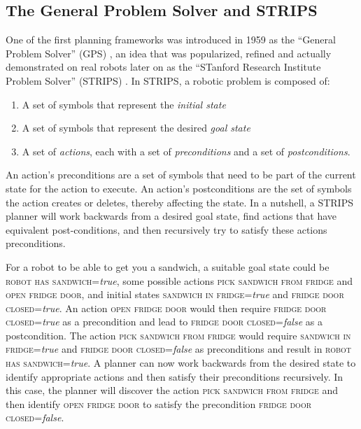 \subsection{The General Problem Solver and STRIPS}

One of the first planning frameworks was introduced in 1959 as the ``General Problem Solver'' (GPS) \cite{newell1959report}, an idea that was popularized, refined and actually demonstrated on real robots later on as the ``STanford Research Institute Problem Solver'' (STRIPS) \cite{fikes1971strips}.
%
In STRIPS, a robotic problem is composed of:

\begin{enumerate}
\item A set of symbols that represent the \textsl{initial state}
\item A set of symbols that represent the desired \textsl{goal state}
\item A set of \textsl{actions}, each with a set of \textsl{preconditions} and a set of \textsl{postconditions}.
\end{enumerate}

An action's preconditions are a set of symbols that need to be part of the current state for the action to execute. An action's postconditions are the set of symbols the action creates or deletes, thereby affecting the state. In a nutshell, a STRIPS planner will work backwards from a desired goal state, find actions that have equivalent post-conditions, and then recursively try to satisfy these actions preconditions.

For a robot to be able to get you a sandwich, a suitable goal state could be \textsc{robot has sandwich}=\textsl{true}, some possible actions \textsc{pick sandwich from fridge} and \textsc{open fridge door}, and initial states \textsc{sandwich in fridge}=\textsl{true} and \textsc{fridge door closed}=\textsl{true}.  An action \textsc{open fridge door} would then require \textsc{fridge door closed}=\textsl{true} as a precondition and lead to \textsc{fridge door closed}=\textsl{false} as a postcondition. The action \textsc{pick sandwich from fridge} would require \textsc{sandwich in fridge}=\textsl{true} and \textsc{fridge door closed}=\textsl{false} as preconditions and result in \textsc{robot has sandwich}=\textsl{true}. A planner can now work backwards from the desired state to identify appropriate actions and then satisfy their preconditions recursively. In this case, the planner will discover the action \textsc{pick sandwich from fridge} and then identify \textsc{open fridge door} to satisfy the precondition \textsc{fridge door closed}=\textsl{false}.

